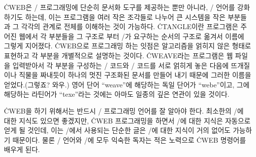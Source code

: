 \.{CWEB}은 \CEE/ 프로그래밍에 단순히 문서화 도구를 제공하는 뿐만 아니라,
\CEE/ 언어를 강화하기도 하는데, 이는 프로그램을 여러 작은 조각들로
나누어 큰 시스템을 작은 부분들과 그 각각의 관계로 전체를 이해하는 것이
가능하다. \.{CTANGLE}이란 프로그램은 주어진 웹에서 각 부분들을 그
구조로 부터 \CEE/가 요구하는 순서의 구조로 옮겨서 이름에 그렇게
지어졌다. \.{CWEB}으로 프로그래밍 하는 잇점은 알고리즘을 얽히지 않은
형태로 표현하고 각 부분을 개별적으로 설명하는 것이다.
\.{CWEAVE}라는 프로그램은 웹 파일을 
입력받아서 각 부분을 구성하는 \TEX/ 코드와 \CEE/ 코드를 서로 얽히게
놓은 다음에 뜨개질이나 직물을 짜내듯이 하나의 멋진 구조화된 문서를 만들어 내기
때문에 그러한 이름을 얻었다.(그렇죠? 와우.) 영어 단어 ``weave''에 해당하는
독일 단어가 ``webe''이고, 그에 해당하는 라틴어가 ``texe''라는 것에는
아마도 일종의 깊은 연관이 있을 것이다. 

\.{CWEB}을 하기 위해서는 반드시 \CEE/ 프로그래밍 언어를 잘 알아야 한다.
최소한의 \TEX/에 대한 지식도 있으면 좋겠지만, \.{CWEB} 프로그래밍을 하면서
\TEX/에 대한 지식은 자동으로 얻게 될 것인데, 이는 \TEX/에서 사용되는
단순한 글은 \TEX/에 대한 지식이 거의 없어도 
가능하기 때문이다. 물론 \CEE/ 언어와 \TEX/에 모두 익숙한
독자는 적은 노력으로 \.{CWEB} 명령어를 배우게 된다.

